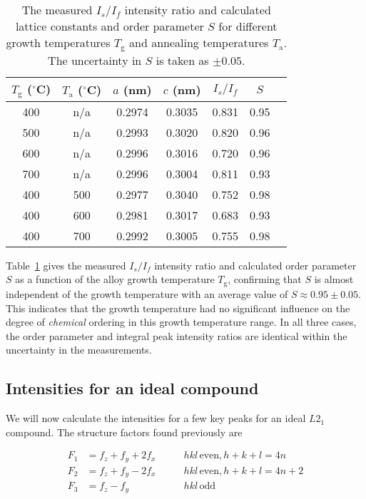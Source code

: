 \documentclass[aps,amsmath,amssymb,prb,superscriptaddress,longtable,preprint,fleqn]{revtex4}
\begin{document}
\begin{table}
\begin{tabular}{@{}ccccccc} \hline
$T_{\mathrm{g}}$ ($^{\circ}$C) & $T_{\mathrm{a}}$ ($^{\circ}$C) & $a$ (nm) & $c$ (nm) & $I_s/I_f$ & $S$  \\ \hline
400 & n/a  & 0.2974&0.3035 &0.831 & 0.95 \\
500 & n/a &0.2993 & 0.3020& 0.820 & 0.96\\
600 & n/a & 0.2996 & 0.3016 & 0.720  & 0.96 \\
700 & n/a & 0.2996 & 0.3004 & 0.811 & 0.93\\ \hline
400 & 500 & 0.2977 & 0.3040 & 0.752 & 0.98\\
400 & 600 & 0.2981 & 0.3017 & 0.683 & 0.93\\
400 & 700 &  0.2992 & 0.3005 &0.755 & 0.98\\ \hline
\end{tabular}
\caption{The measured $I_s/I_f$ intensity ratio and calculated lattice constants and order parameter $S$ for different growth temperatures $T_{\mathrm{g}}$ and annealing temperatures $T_{\mathrm{a}}$. The uncertainty in $S$ is taken as $\pm\!0.05$. }\label{tab:order}
\end{table}

Table~\ref{tab:order} gives the measured $I_s/I_f$ intensity ratio and calculated order parameter $S$ as a function of the alloy growth temperature $T_{\mathrm{g}}$, confirming that $S$ is almost independent of the growth temperature with an average value of $S\!\approx\!0.95\pm 0.05$. This indicates that the growth temperature had no significant influence on the degree of {\em chemical} ordering in this growth temperature range. In all three cases, the order parameter and integral peak intensity ratios are identical within the uncertainty in the measurements. 


\subsection{Intensities for an ideal  compound}

We will now calculate the intensities for a few key peaks for an ideal $L2_1$ compound. The structure factors found previously are

\begin{align}
F_1 &= f_z + f_y + 2f_x \qquad &hkl\,\text{even}, h+k+l = 4n\\
F_2 &= f_z+ f_y - 2f_x \qquad &hkl\,\text{even}, h+k+l = 4n+2\\
F_3 &= f_z - f_y \qquad &hkl\,\text{odd}
\end{align}
\end{document}
